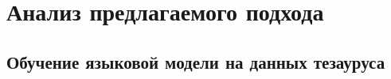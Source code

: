 \documentclass[LI,VKR]{HSEUniversity}
\begin{document}
%
%
%
%
%

\chapter{Анализ предлагаемого подхода}

\section{Обучение языковой модели на данных тезауруса}
\end{document}
